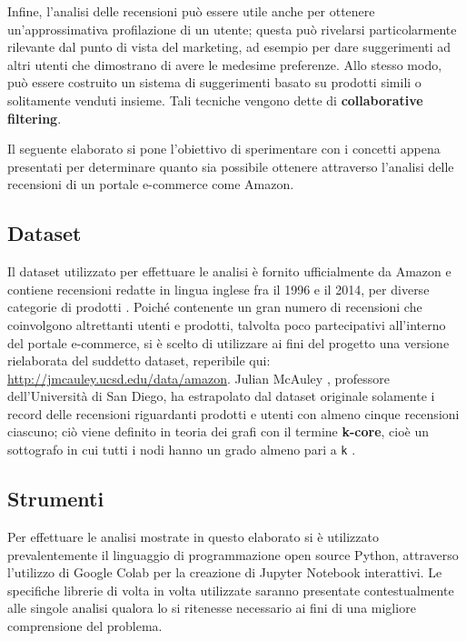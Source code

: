 \documentclass[hidelinks, 12pt]{article}
\begin{document}
Infine, l'analisi delle recensioni può essere utile anche per ottenere un'approssimativa profilazione di un utente; questa può rivelarsi particolarmente rilevante dal punto di vista del marketing, ad esempio per dare suggerimenti ad altri utenti che dimostrano di avere le medesime preferenze. Allo stesso modo, può essere costruito un sistema di suggerimenti basato su prodotti simili o solitamente venduti insieme. Tali tecniche vengono dette di \textbf{collaborative filtering}.

Il seguente elaborato si pone l'obiettivo di sperimentare con i concetti appena presentati per determinare quanto sia possibile ottenere attraverso l'analisi delle recensioni di un portale e-commerce come Amazon.



\subsection{Dataset}
\label{sec:dataset}

Il dataset utilizzato per effettuare le analisi è fornito ufficialmente da Amazon e contiene recensioni redatte in lingua inglese fra il 1996 e il 2014, per diverse categorie di prodotti \cite{site:amazon-reviews-original-dataset}. Poiché contenente un gran numero di recensioni che coinvolgono altrettanti utenti e prodotti, talvolta poco partecipativi all'interno del portale e-commerce, si è scelto di utilizzare ai fini del progetto una versione rielaborata del suddetto dataset, reperibile qui: \url{http://jmcauley.ucsd.edu/data/amazon}. Julian McAuley \cite{site:julianmcauley}, professore dell'Università di San Diego, ha estrapolato dal dataset originale solamente i record delle recensioni riguardanti prodotti e utenti con almeno cinque recensioni ciascuno; ciò viene definito in teoria dei grafi con il termine \textbf{k-core}, cioè un sottografo in cui tutti i nodi hanno un grado almeno pari a \texttt{k} \cite{site:wiki-kcore}.

\nocite{site:amazon-reviews-5-core-dataset}



\subsection{Strumenti}

Per effettuare le analisi mostrate in questo elaborato si è utilizzato prevalentemente il linguaggio di programmazione open source Python, attraverso l'utilizzo di Google Colab \cite{site:google-colab} per la creazione di Jupyter Notebook interattivi. Le specifiche librerie di volta in volta utilizzate saranno presentate contestualmente alle singole analisi qualora lo si ritenesse necessario ai fini di una migliore comprensione del problema.
\end{document}
